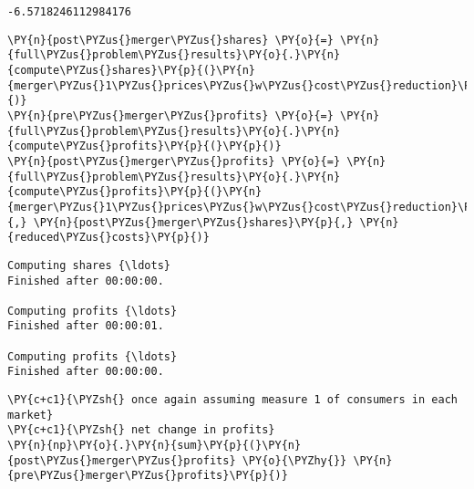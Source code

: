             \begin{tcolorbox}[breakable, size=fbox, boxrule=.5pt, pad at break*=1mm, opacityfill=0]
\begin{Verbatim}[commandchars=\\\{\}]
-6.5718246112984176
\end{Verbatim}
\end{tcolorbox}

    \begin{tcolorbox}[breakable, size=fbox, boxrule=1pt, pad at break*=1mm,colback=cellbackground, colframe=cellborder]
\begin{Verbatim}[commandchars=\\\{\}]
\PY{n}{post\PYZus{}merger\PYZus{}shares} \PY{o}{=} \PY{n}{full\PYZus{}problem\PYZus{}results}\PY{o}{.}\PY{n}{compute\PYZus{}shares}\PY{p}{(}\PY{n}{merger\PYZus{}1\PYZus{}prices\PYZus{}w\PYZus{}cost\PYZus{}reduction}\PY{p}{)}
\PY{n}{pre\PYZus{}merger\PYZus{}profits} \PY{o}{=} \PY{n}{full\PYZus{}problem\PYZus{}results}\PY{o}{.}\PY{n}{compute\PYZus{}profits}\PY{p}{(}\PY{p}{)}
\PY{n}{post\PYZus{}merger\PYZus{}profits} \PY{o}{=} \PY{n}{full\PYZus{}problem\PYZus{}results}\PY{o}{.}\PY{n}{compute\PYZus{}profits}\PY{p}{(}\PY{n}{merger\PYZus{}1\PYZus{}prices\PYZus{}w\PYZus{}cost\PYZus{}reduction}\PY{p}{,} \PY{n}{post\PYZus{}merger\PYZus{}shares}\PY{p}{,} \PY{n}{reduced\PYZus{}costs}\PY{p}{)}
\end{Verbatim}
\end{tcolorbox}

    \begin{Verbatim}[commandchars=\\\{\}]
Computing shares {\ldots}
Finished after 00:00:00.

Computing profits {\ldots}
Finished after 00:00:01.

Computing profits {\ldots}
Finished after 00:00:00.

    \end{Verbatim}

    \begin{tcolorbox}[breakable, size=fbox, boxrule=1pt, pad at break*=1mm,colback=cellbackground, colframe=cellborder]
\begin{Verbatim}[commandchars=\\\{\}]
\PY{c+c1}{\PYZsh{} once again assuming measure 1 of consumers in each market}
\PY{c+c1}{\PYZsh{} net change in profits}
\PY{n}{np}\PY{o}{.}\PY{n}{sum}\PY{p}{(}\PY{n}{post\PYZus{}merger\PYZus{}profits} \PY{o}{\PYZhy{}} \PY{n}{pre\PYZus{}merger\PYZus{}profits}\PY{p}{)}
\end{Verbatim}
\end{tcolorbox}

